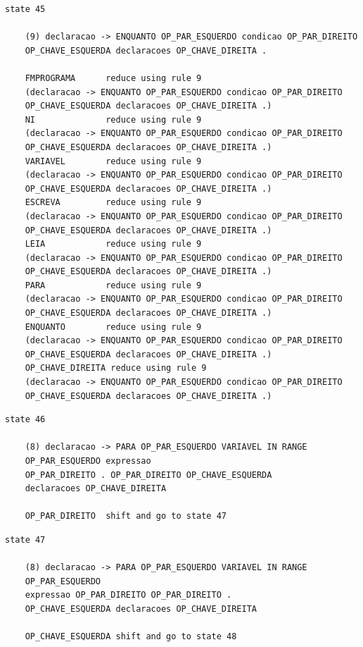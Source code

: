 \documentclass[a4paper,12pt]{article}
\begin{document}
\begin{verbatim}
state 45

    (9) declaracao -> ENQUANTO OP_PAR_ESQUERDO condicao OP_PAR_DIREITO 
    OP_CHAVE_ESQUERDA declaracoes OP_CHAVE_DIREITA .

    FMPROGRAMA      reduce using rule 9 
    (declaracao -> ENQUANTO OP_PAR_ESQUERDO condicao OP_PAR_DIREITO 
    OP_CHAVE_ESQUERDA declaracoes OP_CHAVE_DIREITA .)
    NI              reduce using rule 9 
    (declaracao -> ENQUANTO OP_PAR_ESQUERDO condicao OP_PAR_DIREITO 
    OP_CHAVE_ESQUERDA declaracoes OP_CHAVE_DIREITA .)
    VARIAVEL        reduce using rule 9 
    (declaracao -> ENQUANTO OP_PAR_ESQUERDO condicao OP_PAR_DIREITO 
    OP_CHAVE_ESQUERDA declaracoes OP_CHAVE_DIREITA .)
    ESCREVA         reduce using rule 9 
    (declaracao -> ENQUANTO OP_PAR_ESQUERDO condicao OP_PAR_DIREITO 
    OP_CHAVE_ESQUERDA declaracoes OP_CHAVE_DIREITA .)
    LEIA            reduce using rule 9 
    (declaracao -> ENQUANTO OP_PAR_ESQUERDO condicao OP_PAR_DIREITO 
    OP_CHAVE_ESQUERDA declaracoes OP_CHAVE_DIREITA .)
    PARA            reduce using rule 9 
    (declaracao -> ENQUANTO OP_PAR_ESQUERDO condicao OP_PAR_DIREITO 
    OP_CHAVE_ESQUERDA declaracoes OP_CHAVE_DIREITA .)
    ENQUANTO        reduce using rule 9 
    (declaracao -> ENQUANTO OP_PAR_ESQUERDO condicao OP_PAR_DIREITO 
    OP_CHAVE_ESQUERDA declaracoes OP_CHAVE_DIREITA .)
    OP_CHAVE_DIREITA reduce using rule 9 
    (declaracao -> ENQUANTO OP_PAR_ESQUERDO condicao OP_PAR_DIREITO 
    OP_CHAVE_ESQUERDA declaracoes OP_CHAVE_DIREITA .)
\end{verbatim}

\begin{verbatim}
state 46

    (8) declaracao -> PARA OP_PAR_ESQUERDO VARIAVEL IN RANGE 
    OP_PAR_ESQUERDO expressao 
    OP_PAR_DIREITO . OP_PAR_DIREITO OP_CHAVE_ESQUERDA 
    declaracoes OP_CHAVE_DIREITA

    OP_PAR_DIREITO  shift and go to state 47
\end{verbatim}

\begin{verbatim}
state 47

    (8) declaracao -> PARA OP_PAR_ESQUERDO VARIAVEL IN RANGE 
    OP_PAR_ESQUERDO 
    expressao OP_PAR_DIREITO OP_PAR_DIREITO . 
    OP_CHAVE_ESQUERDA declaracoes OP_CHAVE_DIREITA

    OP_CHAVE_ESQUERDA shift and go to state 48
\end{verbatim}
\end{document}
